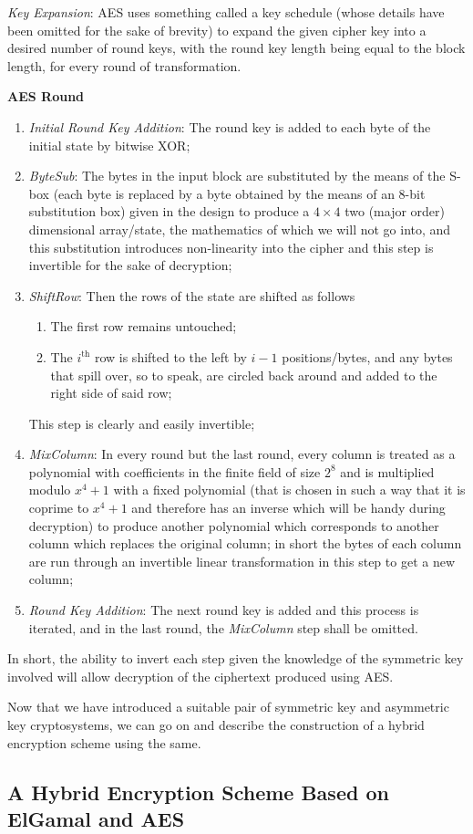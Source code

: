 \emph{Key Expansion}: AES uses something called a key schedule (whose details have been omitted for the sake of brevity) to expand the given cipher key into a desired number of round keys, with the round key length being equal to the block length, for every round of transformation.
\begin{center}
    \textbf{AES Round}
\end{center}
\begin{enumerate}
    \item \emph{Initial Round Key Addition}: The round key is added to each byte of the initial state by bitwise XOR;
    \item \emph{ByteSub}: The bytes in the input block are substituted by the means of the S-box (each byte is replaced by a byte obtained by the means of an $8$-bit substitution box) given in the design to produce a $4\times 4$ two (major order) dimensional array/state, the mathematics of which we will not go into, and this substitution introduces non-linearity into the cipher and this step is invertible for the sake of decryption;
    \item \emph{ShiftRow}: Then the rows of the state are shifted as follows
    \begin{enumerate}
        \item The first row remains untouched;
        \item The $i^\text{th}$ row is shifted to the left by $i-1$ positions/bytes, and any bytes that spill over, so to speak, are circled back around and added to the right side of said row;
    \end{enumerate}
    This step is clearly and easily invertible;
\item \emph{MixColumn}: In every round but the last round, every column is treated as a polynomial with coefficients in the finite field of size $2^8$ and is multiplied modulo $x^4+1$ with a fixed polynomial (that is chosen in such a way that it is coprime to $x^4+1$ and therefore has an inverse which will be handy during decryption) to produce another polynomial which corresponds to another column which replaces the original column; in short the bytes of each column are run through an invertible linear transformation in this step to get a new column;
\item \emph{Round Key Addition}: The next round key is added and this process is iterated, and in the last round, the \emph{MixColumn} step shall be omitted.
\end{enumerate}
In short, the ability to invert each step given the knowledge of the symmetric key involved will allow decryption of the ciphertext produced using AES.

Now that we have introduced a suitable pair of symmetric key and asymmetric key cryptosystems, we can go on and describe the construction of a hybrid encryption scheme using the same.
\subsection{A Hybrid Encryption Scheme Based on ElGamal and AES}
